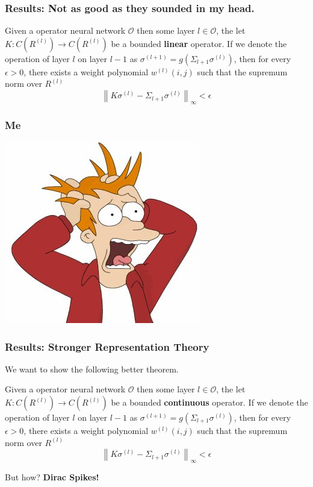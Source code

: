 \documentclass{beamer}
\begin{document}
\begin{frame}
\frametitle{Results: Not as good as they sounded in my head.}
\begin{theorem}
Given a operator neural network $\mathcal{O}$ then some layer $l \in \mathcal{O}$, the let $K:C(R^{(l)})\to C(R^{(l)})$ be a bounded \textbf{linear} operator. If we denote the operation of layer $l$ on layer $l-1$ as $\sigma^{(l+1)} = g\left(\Sigma_{l+1}\sigma^{(l)}\right)$, then for every $\epsilon >0$, there exists a weight polynomial $w^{(l)}(i,j)$ such that the supremum norm over $R^{(l)}$ \begin{equation}\left\|K\sigma^{(l)} -\Sigma_{l+1}\sigma^{(l)}\right\|_{\infty} < \epsilon\end{equation}
\end{theorem}
\end{frame}

\begin{frame}
	\frametitle{Me}
	\centering
	\includegraphics{stress.jpg}
\end{frame}


\begin{frame}
\frametitle{Results: Stronger Representation Theory }

We want to show the following better theorem.
\begin{theorem}
Given a operator neural network $\mathcal{O}$ then some layer $l \in \mathcal{O}$, the let $K:C(R^{(l)})\to C(R^{(l)})$ be a bounded \textbf{continuous} operator. If we denote the operation of layer $l$ on layer $l-1$ as $\sigma^{(l+1)} = g\left(\Sigma_{l+1}\sigma^{(l)}\right)$, then for every $\epsilon >0$, there exists a weight polynomial $w^{(l)}(i,j)$ such that the supremum norm over $R^{(l)}$ \begin{equation}\left\|K\sigma^{(l)} -\Sigma_{l+1}\sigma^{(l)}\right\|_{\infty} < \epsilon\end{equation}
\end{theorem}
But how? \textbf{Dirac Spikes!}
\end{frame}
\end{document}
